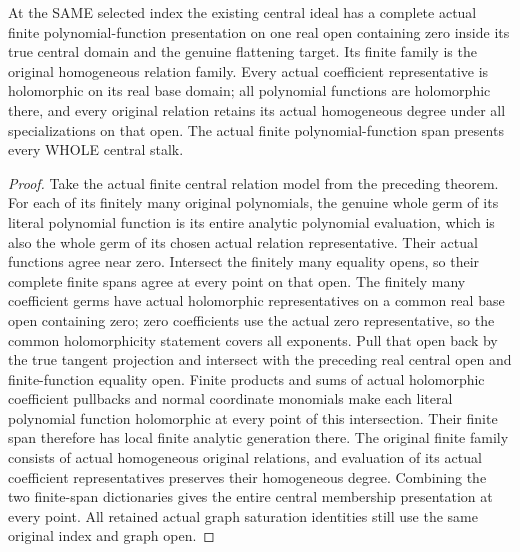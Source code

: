 \begin{theorem}
\label{hir:real-domain-original-whole-central-polynomial-functions}
\leanok
At the SAME selected index the existing central ideal has a complete actual
finite polynomial-function presentation on one real open containing zero
inside its true central domain and the genuine flattening target. Its finite
family is the original homogeneous relation family. Every actual coefficient
representative is holomorphic on its real base domain; all polynomial
functions are holomorphic there, and every original relation retains its
actual homogeneous degree under all specializations on that open. The actual
finite polynomial-function span presents every WHOLE central stalk.
\end{theorem}
\begin{proof}
Take the actual finite central relation model from the preceding theorem.
For each of its finitely many original polynomials, the genuine whole germ of
its literal polynomial function is its entire analytic polynomial evaluation,
which is also the whole germ of its chosen actual relation representative.
Their actual functions agree near zero. Intersect the finitely many equality
opens, so their complete finite spans agree at every point on that open.
The finitely many coefficient germs have actual holomorphic representatives
on a common real base open containing zero; zero coefficients use the actual
zero representative, so the common holomorphicity statement covers all
exponents. Pull that open back by the true tangent projection and intersect
with the preceding real central open and finite-function equality open.
Finite products and sums of actual holomorphic coefficient pullbacks and
normal coordinate monomials make each literal polynomial function holomorphic
at every point of this intersection. Their finite span therefore has local
finite analytic generation there. The original finite family consists of
actual homogeneous original relations, and evaluation of its actual
coefficient representatives preserves their homogeneous degree. Combining
the two finite-span dictionaries gives the entire central membership
presentation at every point. All retained actual graph saturation identities
still use the same original index and graph open.
\end{proof}

